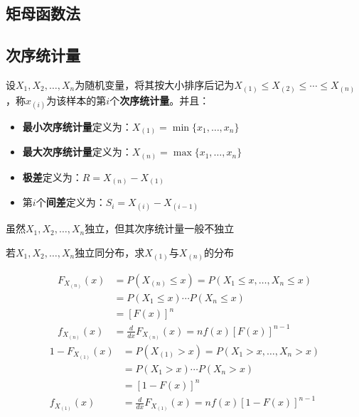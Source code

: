 \subsection{矩母函数法}

\subsection{次序统计量}

\begin{definition}
    设$X_1,X_2,\dotsc,X_n$为随机变量，将其按大小排序后记为$X_{(1)}\le X_{(2)} \le  \cdots \le X_{(n)}$，称$x_{(i)}$为该样本的第$i$个\textbf{次序统计量}。并且：
    \begin{itemize}
        \item \textbf{最小次序统计量}定义为：$X_{(1)}=\min\{x_1,\dotsc,x_n\}$
        \item \textbf{最大次序统计量}定义为：$X_{(n)}=\max\{x_1,\dotsc,x_n\}$
        \item \textbf{极差}定义为：$R=X_{(n)}-X_{(1)}$
        \item 第$i$个\textbf{间差}定义为：$S_i=X_{(i)}-X_{(i-1)}$
    \end{itemize}
\end{definition}

\begin{remark}
    虽然$X_1,X_2,\dotsc,X_n$独立，但其次序统计量一般不独立
\end{remark}

\begin{example}
    若$X_1,X_2,\dotsc,X_n$独立同分布，求$X_{(1)}$与$X_{(n)}$的分布
\end{example}
\begin{solution}
    \begin{align*}
        F_{X_{(n)}}(x) & =P(X_{(n)} \le x)=P(X_1 \le x, \ldots, X_n \le x) \\
                       & =P(X_1 \le x) \cdots P(X_n \le x)                 \\
                       & =[F(x)]^n                                         \\
        f_{X_{(n)}}(x) & = \frac{d}{dx}F_{X_{(n)}}(x) =nf(x)[F(x)]^{n-1}
    \end{align*}
    \begin{align*}
        1-F_{X_{(1)}}(x) & =P(X_{(1)}>x)=P(X_1>x, \ldots, X_n>x)             \\
                         & =P(X_1>x)\cdots P(X_n>x)                          \\
                         & =[1-F(x)]^n                                       \\
        f_{X_{(1)}}(x)   & = \frac{d}{dx}F_{X_{(1)}}(x) =nf(x)[1-F(x)]^{n-1}
    \end{align*}
\end{solution}

